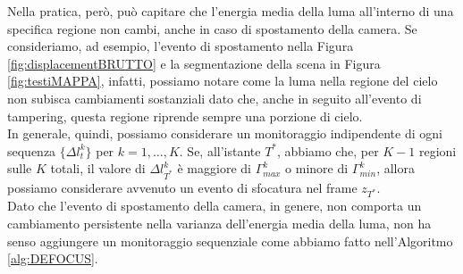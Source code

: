 Nella pratica, per\`o, pu\`o capitare che l'energia media della luma all'interno di una specifica regione non cambi, anche in caso di spostamento della camera.
Se consideriamo, ad  esempio, l'evento di spostamento nella Figura \ref{fig:displacementBRUTTO} e la segmentazione della scena in Figura \ref{fig:testiMAPPA}, infatti, possiamo notare come la luma nella regione del cielo non subisca cambiamenti sostanziali dato che, anche in seguito all'evento di tampering, questa regione riprende sempre una porzione di cielo.\\
In generale, quindi, possiamo considerare un monitoraggio indipendente di ogni sequenza $\{\Delta l_t^k\}$ per $k=1,\dots,K$.
Se, all'istante $T^*$, abbiamo che, per $K-1$ regioni sulle $K$ totali, il valore di $\Delta l_{T^*}^k$ \`e maggiore di $\Gamma_{max}^k$ o minore di $\Gamma_{min}^k$, allora possiamo considerare avvenuto un evento di sfocatura nel frame $z_{T^*}$. \\ 
Dato che l'evento di spostamento della camera, in genere, non comporta un cambiamento persistente nella varianza dell'energia media della luma, non ha senso aggiungere un monitoraggio sequenziale come abbiamo fatto nell'Algoritmo \ref{alg:DEFOCUS}.
